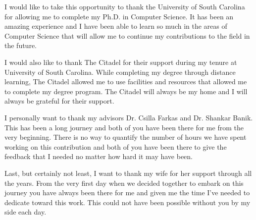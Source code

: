 I would like to take this opportunity to thank the University of South Carolina for allowing me to complete my Ph.D. in Computer Science. It has been an amazing experience and I have been able to learn so much in the areas of Computer Science that will allow me to continue my contributions to the field in the future.

I would also like to thank The Citadel for their support during my tenure at University of South Carolina. While completing my degree through distance learning, The Citadel allowed me to use facilities and resources that allowed me to complete my degree program. The Citadel will always be my home and I will always be grateful for their support.

I personally want to thank my advisors Dr. Csilla Farkas and Dr. Shankar Banik. This has been a long journey and both of you have been there for me from the very beginning. There is no way to quantify the number of hours we have spent working on this contribution and both of you have been there to give the feedback that I needed no matter how hard it may have been.

Last, but certainly not least, I want to thank my wife for her support through all the years. From the very first day when we decided together to embark on this journey you have always been there for me and given me the time I've needed to dedicate toward this work. This could not have been possible without you by my side each day.